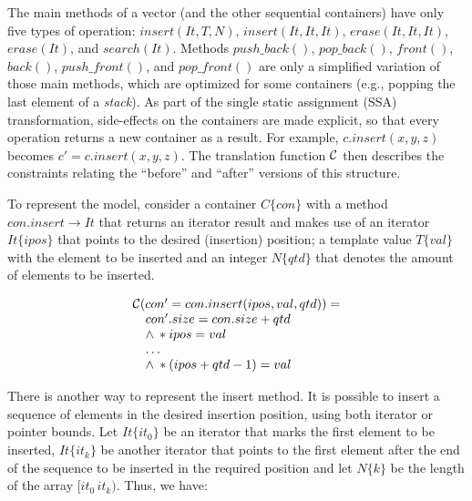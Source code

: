 \documentclass[conference]{IEEEtran}
\begin{document}

The main methods of a vector (and the other sequential containers) have only
five types of operation: $\mathit{insert\left(It, T, N\right)}$,
$\mathit{insert\left(It, It, It\right)}$, $\mathit{erase\left(It, It, It\right)}$,
$\mathit{erase\left(It\right)}$, and $\mathit{search\left(It\right)}$.
Methods $push\_back\left(\right)$, $pop\_back\left(\right)$, $front\left(\right)$,
$back\left(\right)$, $push\_front\left(\right)$, and $pop\_front\left(\right)$ are only
a simplified variation of those main methods, which are optimized for some containers
(e.g., popping the last element of a \textit{stack}).
As part of the single static assignment (SSA) transformation, side-effects on the containers 
are made explicit, so that every operation returns a new container as a result. For example,
$\mathit{c.insert\left(x,y,z\right)}$ becomes $\mathit{c' = c.insert\left(x,y,z\right)}$.
The translation function $\cal C$ then describes the constraints relating the ``before''
and ``after'' versions of this structure.

To represent the model, consider a container $C\{\mathit{con}\}$ with a
method $\mathit{con.insert} \rightarrow It$ that returns an iterator result and
makes use of an iterator $It\{ipos\}$ that points to the desired
(insertion) position; a template value $T\{val\}$ with the element
to be inserted and an integer $N\{qtd\}$ that denotes the amount
of elements to be inserted.

\[\begin{array}{ll}
\multicolumn{2}{l}{{\cal C}(con'=con.insert(ipos, val, qtd))=}\\ 
  &  con'.size = con.size + qtd\\
  & \wedge \: *ipos = val \\
  & \ldots \\
  & \wedge \: *(ipos + qtd - 1) = val \\
\end{array}\]

There is another way to represent the insert method.
It is possible to insert a sequence of elements in the desired
insertion position, using both iterator or pointer bounds.
Let $It\{it_0\}$ be an iterator that marks the first element
to be inserted, $It\{it_k\}$ be another iterator that
points to the first element after the end of the sequence to be inserted
in the required position and let $N\{k\}$ be the length of the array $[it_0\, it_k)$.
Thus, we have:
\end{document}
